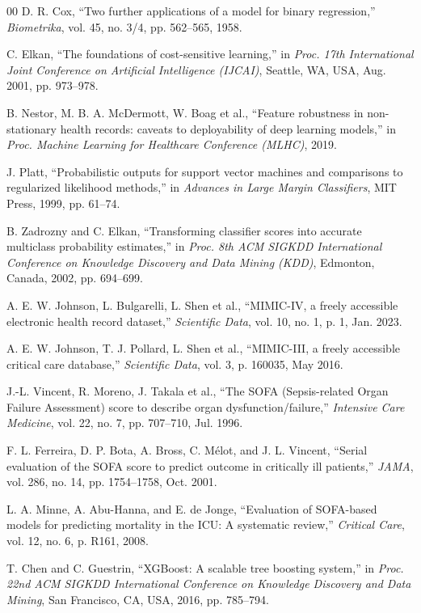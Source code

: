 \documentclass{ieeeaccess}
\begin{document}
\begin{thebibliography}{00}
 D. R. Cox, ``Two further applications of a model for binary regression,'' \emph{Biometrika}, vol. 45, no. 3/4, pp. 562--565, 1958.

 C. Elkan, ``The foundations of cost-sensitive learning,'' in \emph{Proc. 17th International Joint Conference on Artificial Intelligence (IJCAI)}, Seattle, WA, USA, Aug. 2001, pp. 973--978.

 B. Nestor, M. B. A. McDermott, W. Boag et al., ``Feature robustness in non-stationary health records: caveats to deployability of deep learning models,'' in \emph{Proc. Machine Learning for Healthcare Conference (MLHC)}, 2019.

 J. Platt, ``Probabilistic outputs for support vector machines and comparisons to regularized likelihood methods,'' in \emph{Advances in Large Margin Classifiers}, MIT Press, 1999, pp. 61--74.

 B. Zadrozny and C. Elkan, ``Transforming classifier scores into accurate multiclass probability estimates,'' in \emph{Proc. 8th ACM SIGKDD International Conference on Knowledge Discovery and Data Mining (KDD)}, Edmonton, Canada, 2002, pp. 694--699.

 A. E. W. Johnson, L. Bulgarelli, L. Shen et al., ``MIMIC-IV, a freely accessible electronic health record dataset,'' \emph{Scientific Data}, vol. 10, no. 1, p. 1, Jan. 2023.

 A. E. W. Johnson, T. J. Pollard, L. Shen et al., ``MIMIC-III, a freely accessible critical care database,'' \emph{Scientific Data}, vol. 3, p. 160035, May 2016.

 J.-L. Vincent, R. Moreno, J. Takala et al., ``The SOFA (Sepsis-related Organ Failure Assessment) score to describe organ dysfunction/failure,'' \emph{Intensive Care Medicine}, vol. 22, no. 7, pp. 707--710, Jul. 1996.

 F. L. Ferreira, D. P. Bota, A. Bross, C. M\'{e}lot, and J. L. Vincent, ``Serial evaluation of the SOFA score to predict outcome in critically ill patients,'' \emph{JAMA}, vol. 286, no. 14, pp. 1754--1758, Oct. 2001.

 L. A. Minne, A. Abu-Hanna, and E. de Jonge, ``Evaluation of SOFA-based models for predicting mortality in the ICU: A systematic review,'' \emph{Critical Care}, vol. 12, no. 6, p. R161, 2008.

 T. Chen and C. Guestrin, ``XGBoost: A scalable tree boosting system,'' in \emph{Proc. 22nd ACM SIGKDD International Conference on Knowledge Discovery and Data Mining}, San Francisco, CA, USA, 2016, pp. 785--794.


\end{thebibliography}
\end{document}
